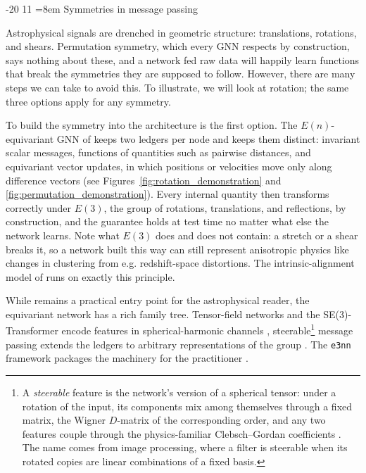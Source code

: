 \documentclass[graybox, envcountchap]{Template/svmult}
\makeatletter
\renewcommand\subsection{\@startsection{subsection}{2}{\z@}%
                       {-20\p@}%
                       {11\p@}%
                       {\normalfont\subsecsize\subsecstyle
                        \rightskip=\z@ \@plus 8em\pretolerance=10000 }}
\makeatother
\begin{document}
\subsection{Symmetries in message passing}
\label{subsec:equivariant-mp}

Astrophysical signals are drenched in geometric structure: translations, rotations, and shears. Permutation symmetry, which every GNN respects by construction, says nothing about these, and a network fed raw data will happily learn functions that break the symmetries they are supposed to follow. However, there are many steps we can take to avoid this. To illustrate, we will look at rotation; the same three options apply for any symmetry.

To build the symmetry into the architecture is the first option. The $E(n)$-equivariant GNN of \citet{Satorras2021_EGNN_equivariant} keeps two ledgers per node and keeps them distinct: invariant scalar messages, functions of quantities such as pairwise distances, and equivariant vector updates, in which positions or velocities move only along difference vectors (see Figures~\ref{fig:rotation_demonstration} and \ref{fig:permutation_demonstration}). Every internal quantity then transforms correctly under $E(3)$, the group of rotations, translations, and reflections, by construction, and the guarantee holds at test time no matter what else the network learns. Note what $E(3)$ does and does not contain: a stretch or a shear breaks it, so a network built this way can still represent anisotropic physics like changes in clustering from e.g. redshift-space distortions. The intrinsic-alignment model of \citet{Jagvaral2022_intrinsicalignment_GNN} runs on exactly this principle. 

While \citet{Satorras2021_EGNN_equivariant} remains a practical entry point for the astrophysical reader, the equivariant network has a rich family tree. Tensor-field networks and the SE(3)-Transformer encode features in spherical-harmonic channels \citep{Thomas2018_TensorFieldNetworks, Fuchs2020_SE3_GAT}, steerable\footnote{A \emph{steerable} feature is the network's version of a spherical tensor: under a rotation of the input, its components mix among themselves through a fixed matrix, the Wigner $D$-matrix of the corresponding order, and any two features couple through the physics-familiar Clebsch--Gordan coefficients \citep{CohenWelling2017_steerable_CNN}. The name comes from image processing, where a filter is steerable when its rotated copies are linear combinations of a fixed basis.} message passing extends the ledgers to arbitrary representations of the group \citep{Brandstetter2022_SteerableE3GNN}. The \texttt{e3nn} framework packages the machinery for the practitioner \citep{Geiger2022_E3NN_GeneralFramework}.
\end{document}
